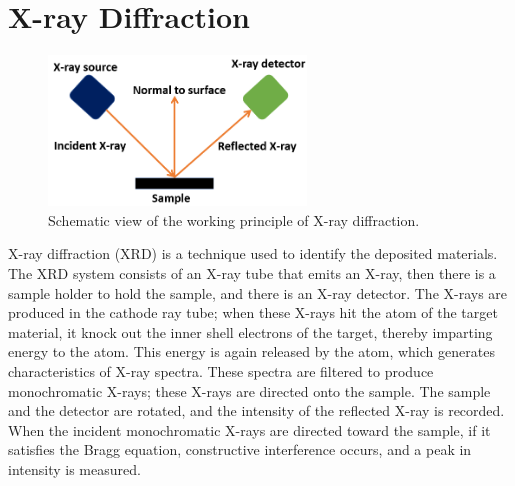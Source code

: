 \documentclass[12pt,a4paper,bold]{thesis}
\theoremstyle{thm}
\theoremstyle{definition}
\begin{document}
\section{X-ray Diffraction }
\begin{figure}[H]
	\centering
   \includegraphics[height=4cm]{Images/70.png} 
   \caption{Schematic view of the working principle of X-ray diffraction.}
\end{figure}
\indent\indent\indent X-ray diffraction (XRD) is a technique used to identify the deposited materials. The XRD system consists of an X-ray tube that emits an X-ray, then there is a sample holder to hold the sample, and there is an X-ray detector. The X-rays are produced in the cathode ray tube; when these X-rays hit the atom of the target material, it knock out the inner shell electrons of the target, thereby imparting energy to the atom. This energy is again released by the atom, which generates characteristics of X-ray spectra. These spectra are filtered to produce monochromatic X-rays; these X-rays are directed onto the sample. The sample and the detector are rotated, and the intensity of the reflected X-ray is recorded. When the incident monochromatic X-rays are directed toward the sample, if it satisfies the Bragg equation, constructive interference occurs, and a peak in intensity is measured. 
\end{document}
